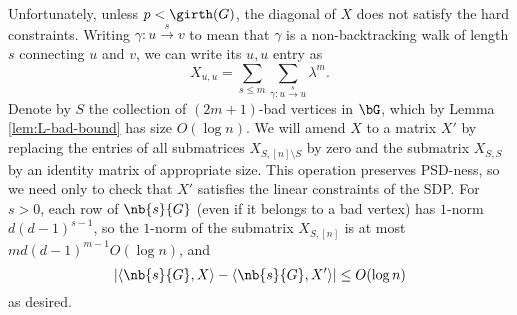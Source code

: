 Unfortunately, unless $p < \girth(G)$, the diagonal of $X$ does not satisfy the hard constraints. Writing $\gamma : u \overset{s}\to v$ to mean that $\gamma$ is a non-backtracking walk of length $s$ connecting $u$ and $v$, we can write its $u,u$ entry as
$$
    X_{u,u} = \sum_{s \le m} \sum_{\gamma : u \overset{s}\to u} \lambda^m.
$$
Denote by $S$ the collection of $(2m + 1)$-bad vertices in $\bG$, which by Lemma \ref{lem:L-bad-bound} has size $O(\log n)$. We will amend $X$ to a matrix $X'$ by replacing the entries of all submatrices $X_{S,[n]\setminus S}$ by zero and the submatrix $X_{S,S}$ by an identity matrix of appropriate size. This operation preserves PSD-ness, so we need only to check that $X'$ satisfies the linear constraints of the SDP. For $s>0$, each row of $\nb{s}{G}$ (even if it belongs to a bad vertex) has $1$-norm $d(d-1)^{s-1}$, so the $1$-norm of the submatrix $X_{S,[n]}$ is at most $m d(d-1)^{m-1} O(\log n)$, and 
$$
    \left|\langle \nb{s}{G}, X \rangle - \langle \nb{s}{G}, X' \rangle \right| \le O(\log n)
$$
as desired.







